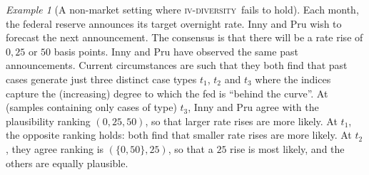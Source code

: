 \documentclass[ecta,nameyear,draft]{econsocart}
\newcommand{\fourdiv}{\textsc{iv}-\textsc{diversity}}
\theoremstyle{plain}
\theoremstyle{remark}
\newtheorem{example}{Example}%
\begin{document}
\begin{example}[A non-market setting where \fourdiv\ fails to hold]
  \label{eg-rates} Each month, the federal reserve announces its target
  overnight rate.  Inny and {Pru} wish to forecast the next announcement. The
  consensus is that there will be a rate rise of ${0}, {25}$ or ${50}$ basis
  points.  Inny and {Pru} have observed the same past announcements.  Current
  circumstances are such that they both find that past cases generate just
  three distinct case types $t_1$, $t_2$ and $t_3$ where the indices capture
  the (increasing) degree to which the fed is ``behind the curve''.  At
  (samples containing only cases of type) $t_3$, Inny and {Pru} agree with the
  plausibility ranking $\left({0}, {25}, {50}\right)$, so that larger rate
  rises are more likely.  At $t_1$, the opposite ranking holds: both find that
  smaller rate rises are more likely. At $t_2$, they agree ranking is
  $\left(\{{0}, {50}\}, {25}\right)$, so that a ${25}$ rise is most likely, and
  the others are equally plausible. 
 

\end{example}
\end{document}

